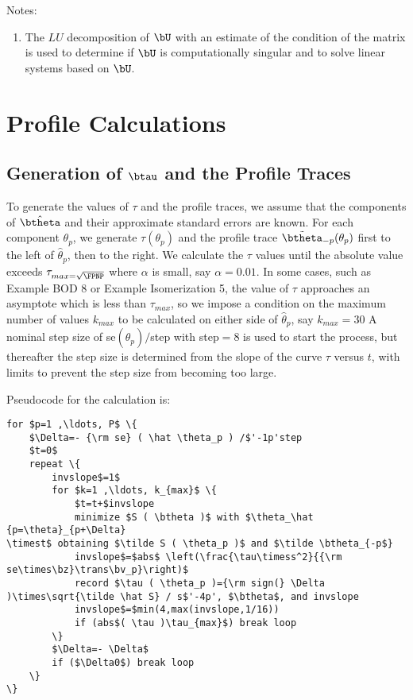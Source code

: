{Notes:
\begin{enumerate}
\item The $LU$ decomposition \cite[Chapter
  1]{dong:bunc:mole:stew:1979} of  $\bU$ with an 
estimate of the condition of the matrix is used to determine if $\bU$
is computationally singular and to solve linear systems based on $\bU$.
\end{enumerate}

\section{Profile Calculations}

\subsection{Generation of $\btau$ and the Profile Traces}

To generate the values of $\tau$ and the profile traces, we assume that
the components of $\hat \btheta$ and their approximate standard errors
are known.
For each component $\theta_{p}$, we generate $\tau ( \theta_p )$ and
the profile trace $\tilde \btheta_{-p} ( \theta_p )$ first to the left
of $\hat \theta_{p}$, then to the right.
We calculate the $\tau$ values until the absolute value exceeds
$\tau_{max=\sqrt{\FPNP}}$ where $\alpha$ is small, say $\alpha=0.01$.
In some cases, such as Example BOD 8 or Example Isomerization 5, the
value of $\tau$ approaches an asymptote which is less than
$\tau_{max}$, so we impose a condition on the maximum number of values
$k_{max}$ to be calculated on either side of $\hat \theta_{p}$, say
$k_{max} = 30$  A nominal step size of se$( \hat \theta_p ) /$step 
with step$=8$ is used to start the process, but thereafter the
step size is determined from the slope of the curve $\tau$ versus $t$,
with limits to prevent the step size from becoming too large.

Pseudocode for the calculation is:
\begin{verbatim}
for $p=1 ,\ldots, P$ \{
    $\Delta=- {\rm se} ( \hat \theta_p ) /$'-1p'step
    $t=0$
    repeat \{
        invslope$=1$
        for $k=1 ,\ldots, k_{max}$ \{
            $t=t+$invslope
            minimize $S ( \btheta )$ with $\theta_\hat {p=\theta}_{p+\Delta}
\timest$ obtaining $\tilde S ( \theta_p )$ and $\tilde \btheta_{-p$}
            invslope$=$abs$ \left(\frac{\tau\timess^2}{{\rm se\times\bz}\trans\bv_p}\right)$
            record $\tau ( \theta_p )={\rm sign(} \Delta )\times\sqrt{\tilde \hat S} / s$'-4p', $\btheta$, and invslope
            invslope$=$min(4,max(invslope,1/16))
            if (abs$( \tau )\tau_{max}$) break loop
        \}
        $\Delta=- \Delta$
        if ($\Delta0$) break loop
    \}
\}
\end{verbatim}

}

